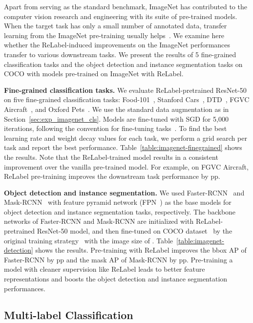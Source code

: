 \documentclass[final]{cvpr}
\newcommand\ours{{{\mbox{ReLabel}}}\xspace}
\begin{document}
Apart from serving as the standard benchmark, ImageNet has contributed to the computer vision research and engineering with its suite of pre-trained models.
When the target task has only a small number of annotated data, transfer learning from the ImageNet pre-training usually helps~\cite{kornblith2019better}.
We examine here whether the \ours-induced improvements on the ImageNet performances transfer to various downstream tasks. 
We present the results of 5 fine-grained classification tasks and the object detection and instance segmentation tasks on COCO with models pre-trained on ImageNet with \ours. 


\noindent\textbf{Fine-grained classification tasks.}
We evaluate \ours-pretrained ResNet-50 on five fine-grained classification tasks: Food-101~\cite{food101}, Stanford Cars~\cite{stanford_cars}, DTD~\cite{cimpoi14describing}, FGVC Aircraft~\cite{fgvc_aircraft}, and Oxford Pets~\cite{parkhi12a}. 
We use the standard data augmentation as in Section~\ref{sec:exp_imagenet_cls}. Models are fine-tuned with SGD for 5,000 iterations, 
following the convention for fine-tuning tasks~\cite{chatfield2014return}.
To find the best learning rate and weight decay values for each task, we perform a grid search per task and report the best performance.
Table~\ref{table:imagenet-finegrained} shows the results. 
Note that the \ours-trained model results in a consistent improvement over the vanilla pre-trained model. For example, on FGVC Aircraft, \ours pre-training improves the downstream task performance by  pp.




\noindent\textbf{Object detection and instance segmentation.}
We used Faster-RCNN~\cite{fasterrcnn} and Mask-RCNN~\cite{he2017mask} with feature pyramid network (FPN~\cite{lin2017feature}) as the base models for object detection and instance segmentation tasks, respectively.
The backbone networks of Faster-RCNN and Mask-RCNN are initialized with \ours-pretrained ResNet-50 model, and then fine-tuned on COCO dataset~\cite{lin2014microsoft} by the original training strategy~\cite{fasterrcnn,he2017mask} with the image size of .
Table~\ref{table:imagenet-detection} shows the results. 
Pre-training with \ours improves the bbox AP of Faster-RCNN by  pp and the mask AP of Mask-RCNN by  pp. Pre-training a model with cleaner supervision like \ours leads to better feature representations and boosts the object detection and instance segmentation performances.  
 
\subsection{Multi-label Classification}
\label{sec:exp_multilabel_cls}
\end{document}
